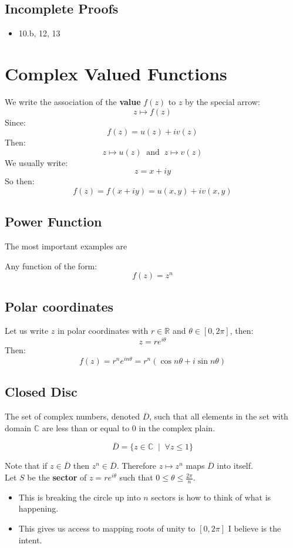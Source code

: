 \subsection{Incomplete Proofs}
\begin{itemize}
	\item 10.b, 12, 13
\end{itemize}

\section{Complex Valued Functions}
We write the association of the \textbf{value} $f(z)$ to $z$ by the special arrow:
\[z \mapsto f(z) \]
Since:
\[f(z) = u(z) +iv(z)\]
Then:
\[z \mapsto u(z) \;\; \text{and} \;\;  z \mapsto v(z) \]
We usually write:
\[z = x + iy\]
So then:
\[f(z) = f(x + iy) = u(x,y) + iv(x,y)\]

\subsection{Power Function}
The most important examples are 
\begin{defn}
Any function of the form:
	\[f(z) = z^n\]
\end{defn}
\subsection{Polar coordinates}
Let us write $z$ in polar coordinates with $r \in \mathbb{R}$ and $\theta \in [0, 2\pi]$, then:
\[ z = re^{i\theta}\]
Then:
\[f(z) = r^ne^{in\theta} = r^n(\cos{n\theta} + i\sin{n\theta})\]

\subsection{Closed Disc}
The set of complex numbers, denoted $\overline{D}$, such that all elements in the set with domain $\mathbb{C}$ are less than or equal to $0$ in the complex plain.
\begin{defn}
	\[\overline{D} = \{z \in \mathbb{C} \;\;|\;\; \forall z \leq 1 \} \]
\end{defn}
Note that if $z \in \overline{D}$ then $z^n \in \overline{D}$. Therefore $z \mapsto z^n$ maps $\overline{D}$ into itself. \\

Let $S$ be the \textbf{sector} of $z = re^{i\theta}$ such that $0 \leq \theta \leq \frac{2\pi}{n}.$ 
\begin{itemize}
	\item This is breaking the circle up into $n$ sectors is how to think of what is happening. 
	\item This gives us access to mapping roots of unity to $[0, 2\pi]$ I believe is the intent.
\end{itemize}

